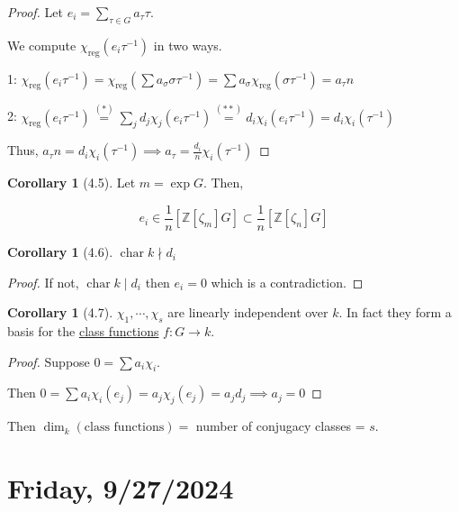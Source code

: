 \documentclass{article}
\theoremstyle{definition}
\newtheorem{corollary}[theorem]{Corollary}
\newcommand{\Char}{\operatorname{char}}
\begin{document}
\begin{proof}
    Let \(e_i = \sum_{\tau \in G} a_\tau \tau \).
    
    We compute \(\chi_{\text{reg}}(e_i \tau ^{-1})\) in two ways.
    
    1: \(\chi_{\text{reg}}(e_i \tau ^{-1} ) = \chi_{\text{reg}}(\sum a_\sigma \sigma \tau ^{-1}) = \sum a_\sigma \chi_{\text{reg}}(\sigma \tau ^{-1}) = a_{\tau}n\)
    
    2: \(\chi_{\text{reg}}(e_i \tau ^{-1}) \overset{(\ast)}{=} \sum_{j} d_j \chi_j (e_i \tau ^{-1}) \overset{(\ast\ast)}{=} d_i \chi_i (e_i \tau ^{-1}) = d_i \chi_i (\tau ^{-1}) \)
    
    Thus, \(a_\tau n = d_i \chi_i (\tau ^{-1}) \implies a_\tau = \frac{d_i}{n} \chi_i (\tau ^{-1})\) 
\end{proof}

\begin{corollary}
    [4.5] Let \(m = \exp G\). Then, 

    \[
        e_i \in \frac{1}{n} \left[ \mathbb{Z} [\zeta_m] G \right] \subset \frac{1}{n} \left[ \mathbb{Z} [\zeta_n] G \right]
    \]
\end{corollary}

\begin{corollary}
    [4.6] \(\Char k \nmid d_i\) 
\end{corollary}

\begin{proof}
    If not, \(\Char k \mid d_i\) then \(e_i = 0\) which is a contradiction. 
\end{proof}

\begin{corollary}
    [4.7] \(\chi_1, \cdots , \chi_s\) are linearly independent over \(k\). In fact they form a basis for the \underline{class functions} \(f: G \to k\). 
\end{corollary}

\begin{proof}
    Suppose \(0 = \sum a_i \chi_i\). 

    Then \(0 = \sum a_i \chi_i(e_j) = a_j \chi_j (e_j) = a_j d_j \implies a_j = 0\) 
\end{proof}

Then \(\dim_k(\text{class functions}) = \) number of conjugacy classes = \(s\). 


\section*{Friday, 9/27/2024}
\end{document}
